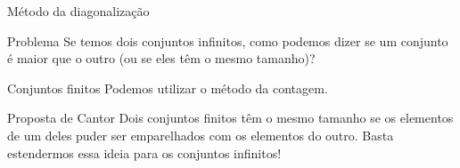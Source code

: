 \documentclass[xcolor=dvipsnames,table]{beamer}
\begin{document}
	\begin{frame}{Método da diagonalização}
		\begin{alertblock}{Problema}
			Se temos dois conjuntos infinitos, como podemos dizer se um conjunto é maior que o outro (ou se eles têm o mesmo tamanho)?
		\end{alertblock} \pause
		\begin{block}{Conjuntos finitos}
			Podemos utilizar o método da contagem.
		\end{block} \pause
		\begin{exampleblock}{Proposta de Cantor}
			Dois conjuntos finitos têm o mesmo tamanho se os elementos de um deles puder ser emparelhados com os elementos do outro. Basta estendermos essa ideia para os conjuntos infinitos!
		\end{exampleblock}
	\end{frame}
	
	\begin{frame}
		\titlepage
	\end{frame}
	
\end{document}
